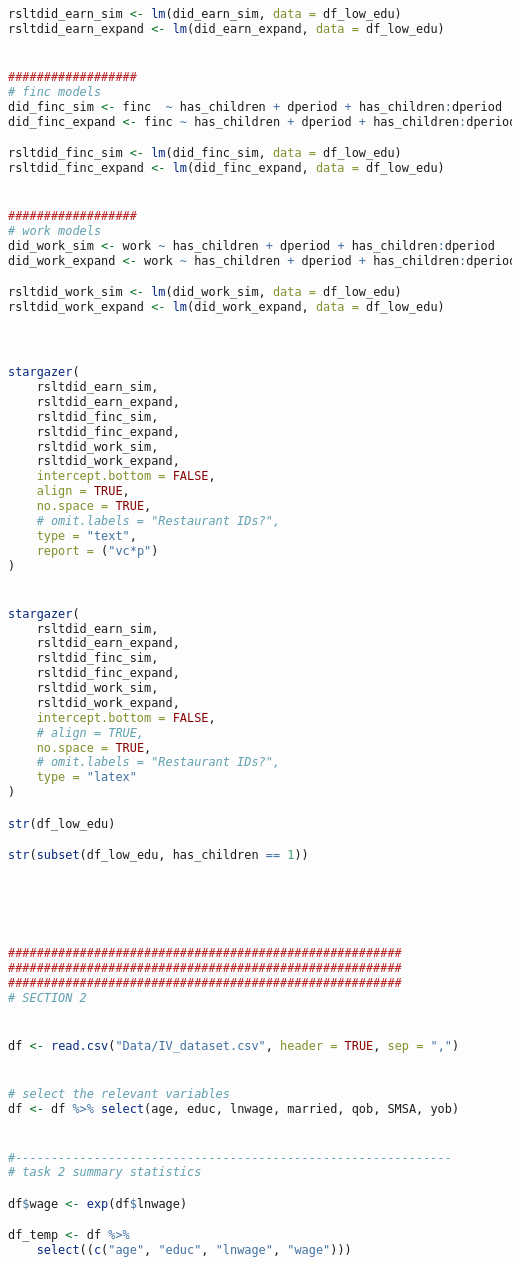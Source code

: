 \documentclass[a4paper]{article}
\begin{document}
\begin{lstlisting}[language=R]
rsltdid_earn_sim <- lm(did_earn_sim, data = df_low_edu)
rsltdid_earn_expand <- lm(did_earn_expand, data = df_low_edu)


##################
# finc models
did_finc_sim <- finc  ~ has_children + dperiod + has_children:dperiod
did_finc_expand <- finc ~ has_children + dperiod + has_children:dperiod + age + urate + nonwhite

rsltdid_finc_sim <- lm(did_finc_sim, data = df_low_edu)
rsltdid_finc_expand <- lm(did_finc_expand, data = df_low_edu)


##################
# work models
did_work_sim <- work ~ has_children + dperiod + has_children:dperiod
did_work_expand <- work ~ has_children + dperiod + has_children:dperiod + age + urate + nonwhite

rsltdid_work_sim <- lm(did_work_sim, data = df_low_edu)
rsltdid_work_expand <- lm(did_work_expand, data = df_low_edu)



stargazer(
    rsltdid_earn_sim,
    rsltdid_earn_expand,
    rsltdid_finc_sim,
    rsltdid_finc_expand,
    rsltdid_work_sim,
    rsltdid_work_expand,
    intercept.bottom = FALSE,
    align = TRUE,
    no.space = TRUE,
    # omit.labels = "Restaurant IDs?",
    type = "text",
    report = ("vc*p")
)


stargazer(
    rsltdid_earn_sim,
    rsltdid_earn_expand,
    rsltdid_finc_sim,
    rsltdid_finc_expand,
    rsltdid_work_sim,
    rsltdid_work_expand,
    intercept.bottom = FALSE,
    # align = TRUE,
    no.space = TRUE,
    # omit.labels = "Restaurant IDs?",
    type = "latex"
)

str(df_low_edu)

str(subset(df_low_edu, has_children == 1))





#######################################################
#######################################################
#######################################################
# SECTION 2


df <- read.csv("Data/IV_dataset.csv", header = TRUE, sep = ",")


# select the relevant variables
df <- df %>% select(age, educ, lnwage, married, qob, SMSA, yob)


#-------------------------------------------------------------
# task 2 summary statistics

df$wage <- exp(df$lnwage)

df_temp <- df %>%
    select((c("age", "educ", "lnwage", "wage")))


\end{lstlisting}
\end{document}
